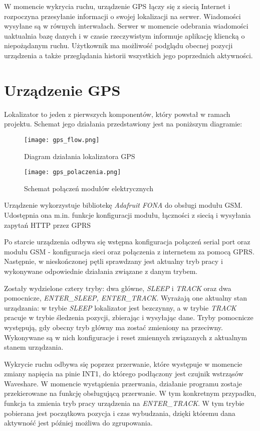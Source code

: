 \documentclass[eng,printmode]{mgr}
\begin{document}
W momencie wykrycia ruchu, urządzenie GPS łączy się z siecią Internet i rozpoczyna przesyłanie informacji o swojej lokalizacji na serwer. Wiadomości wysyłane są w równych interwałach. Serwer w momencie odebrania wiadomości uaktualnia bazę danych i w czasie rzeczywistym informuje aplikację kliencką o niepożądanym ruchu. Użytkownik ma możliwość podglądu obecnej pozycji urządzenia a także przeglądania historii wszystkich jego poprzednich aktywności.



\section{Urządzenie GPS}
Lokalizator to jeden z pierwszych komponentów, który powstał w ramach projektu. Schemat jego działania przedstawiony jest na poniższym diagramie:
\begin{figure}
\centering
\texttt{[image: gps\_flow.png]}
\caption{Diagram działania lokalizatora GPS}
\end{figure}

\begin{figure}
\centering
\texttt{[image: gps\_polaczenia.png]}
\caption{Schemat połączeń modułów elektrycznych}
\end{figure}

Urządzenie wykorzystuje bibliotekę \textit{Adafruit FONA} do obsługi modułu GSM. Udostępnia ona m.in. funkcje konfiguracji modułu, łączności z siecią i wysyłania zapytań HTTP przez GPRS

Po starcie urządzenia odbywa się wstępna konfiguracja połączeń serial port oraz modułu GSM - konfiguracja sieci oraz połączenia z internetem za pomocą GPRS. Następnie, w nieskończonej pętli sprawdzany jest aktualny tryb pracy i wykonywane odpowiednie działania związane z danym trybem. 

Zostały wydzielone cztery tryby: dwa główne, \textit{SLEEP} i \textit{TRACK} oraz dwa pomocnicze, \textit{ENTER\_SLEEP, ENTER\_TRACK}. Wyrażają one aktualny stan urządzania: w trybie \textit{SLEEP} lokalizator jest bezczynny, a w trybie \textit{TRACK} pracuje w trybie śledzenia pozycji, zbierając i wysyłając dane. Tryby pomocnicze występują, gdy obecny tryb główny ma zostać zmieniony na przeciwny. Wykonywane są w nich konfiguracje i reset zmiennych związanych z aktualnym stanem urządzania.

Wykrycie ruchu odbywa się poprzez przerwanie, które występuje w momencie zmiany napięcia na pinie INT1, do którego podłączony jest czujnik wstrząsów Waveshare. W momencie wystąpienia przerwania, działanie programu zostaje przekierowane na funkcję obsługującą przerwanie. W tym konkretnym przypadku, funkcja ta zmienia tryb pracy urządzenia na \textit{ENTER\_TRACK}. W tym trybie pobierana jest początkowa pozycja i czas wybudzania, dzięki któremu dana aktywność jest później możliwa do zgrupowania. 
\end{document}
